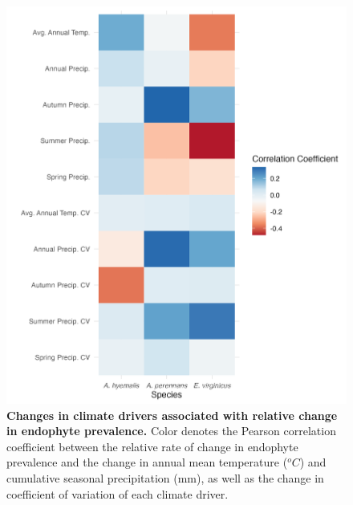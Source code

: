\documentclass[11pt]{article}
\begin{document}
\begin{figure}[H]
	\centering
	\includegraphics[width = .8\linewidth]{climate_corr_heatmap.png}
	\caption{\textbf{Changes in climate drivers associated with relative change in endophyte prevalence.} Color denotes the Pearson correlation coefficient between the relative rate of change in endophyte prevalence and the change in annual mean temperature ($^oC$) and cumulative seasonal precipitation (mm), as well as the change in coefficient of variation of each climate driver.}
\end{figure}
\end{document}
